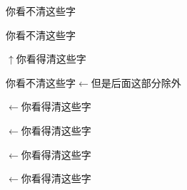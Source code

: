 ﻿\documentclass{article}
\begin{document}
\hrulefill



    你看不清这些字

    你看不清这些字

    $\uparrow$\mbox{你看得清这些字}

    你看不清这些字$\leftarrow$\mbox{但是后面这部分除外}

    \indent{}$\leftarrow$\mbox{你看得清这些字}

    \noindent{}$\leftarrow$\mbox{你看得清这些字}

    \hspace{5em}$\leftarrow$\mbox{你看得清这些字}

    \hspace{-5em}$\leftarrow$\mbox{你看得清这些字}
\end{document}
